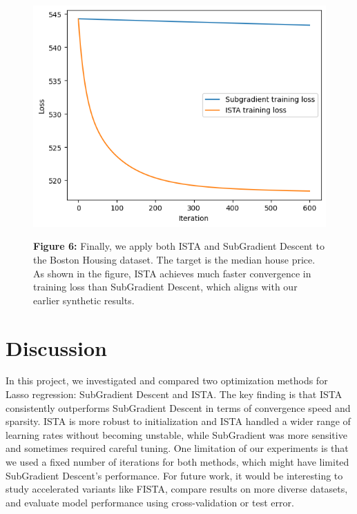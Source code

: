 \documentclass[11pt]{article}
\begin{document}
\begin{figure}[H]
    \centering
    \begin{minipage}{0.3\textwidth}
        \includegraphics[width=\linewidth]{figures/fig8.png}
    \end{minipage}
    \hfill
    \begin{minipage}{0.5\textwidth}
        \small
        \textbf{Figure 6:}
        Finally, we apply both ISTA and SubGradient Descent to the Boston Housing dataset. The
        target is the median house price.
        As shown in the figure, ISTA achieves much faster convergence in training loss than SubGradient Descent, which aligns with our earlier synthetic results.

    \end{minipage}
\end{figure}


\section{Discussion}

In this project, we investigated and compared two optimization methods for Lasso regression: SubGradient Descent and ISTA.
The key finding is that ISTA consistently outperforms SubGradient Descent in terms of convergence speed and sparsity.
ISTA is more robust to initialization and ISTA handled a wider range of learning rates without becoming unstable, while SubGradient was more sensitive and sometimes required careful tuning.
One limitation of our experiments is that we used a fixed number of iterations for both methods, which might have limited SubGradient Descent’s performance.
For future work, it would be interesting to study accelerated variants like FISTA, compare results on more diverse datasets, and evaluate model performance using cross-validation or test error.
\end{document}
